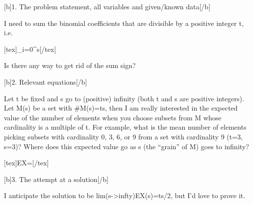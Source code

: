[b]1. The problem statement, all variables and given/known data[/b]

I need to sum the binomial coefficients that are divisible by a
positive integer t, i.e.

[tex]\sum_{i=0}^{s}[/tex]

Is there any way to get rid of the sum sign?

[b]2. Relevant equations[/b]

Let t be fixed and s go to (positive) infinity (both t and s are
positive integers). Let M(s) be a set with #M(s)=ts, then I am really
interested in the expected value of the number of elements when you
choose subsets from M whose cardinality is a multiple of t. For
example, what is the mean number of elements picking subsets with
cardinality 0, 3, 6, or 9 from a set with cardinality 9 (t=3, s=3)?
Where does this expected value go as s (the ``grain'' of M) goes to
infinity?

[tex]EX=[/tex]

[b]3. The attempt at a solution[/b]

I anticipate the solution to be lim(s->infty)EX(s)=ts/2, but I'd love
to prove it.
